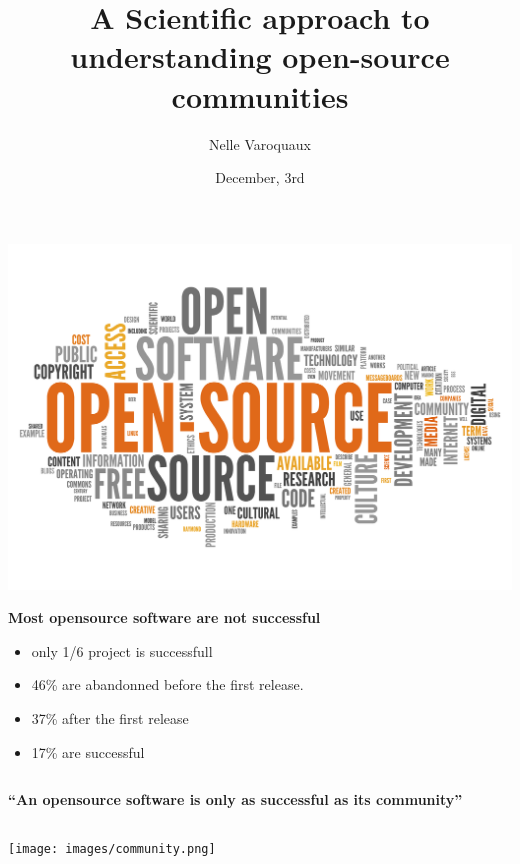 \documentclass[xcolor=dvipsnames]{beamer}
\title{\textbf{A Scientific approach to understanding open-source communities}}
\author[Varoquaux Nelle]{
Nelle Varoquaux}
\date{December, 3rd}
\institute{Mines ParisTech, Institut Curie, INSERM}
\begin{document}
\begin{frame}[t, noframenumbering]
  \maketitle

\end{frame}

\setcounter{framenumber}{0}


\begin{frame}
\frametitle{}

\begin{center}
\includegraphics[width=0.8\linewidth]{figures/Open-Source-Word-Cloud.jpg}
\end{center}
\end{frame}

\begin{frame}
{\Large \bf Most opensource software are not successful}
\begin{itemize}[label={$\bullet$}]
\item only 1/6 project is successfull
\item 46\% are abandonned before the first release.
\item 37\% after the first release
\item 17\% are successful
\end{itemize}
\begin{flushright}
{\scriptsize}
\end{flushright}
\end{frame}

\begin{frame}
\hspace{-3em}
\begin{columns}
\begin{column}{0.6\linewidth}
{\Large \bf ``An opensource software is only as successful as its community''}
\end{column}
\begin{column}{0.4\linewidth}
\end{column}
\end{columns}
\begin{flushright}
\texttt{[image: images/community.png]}
\end{flushright}
\end{frame}
\end{document}
